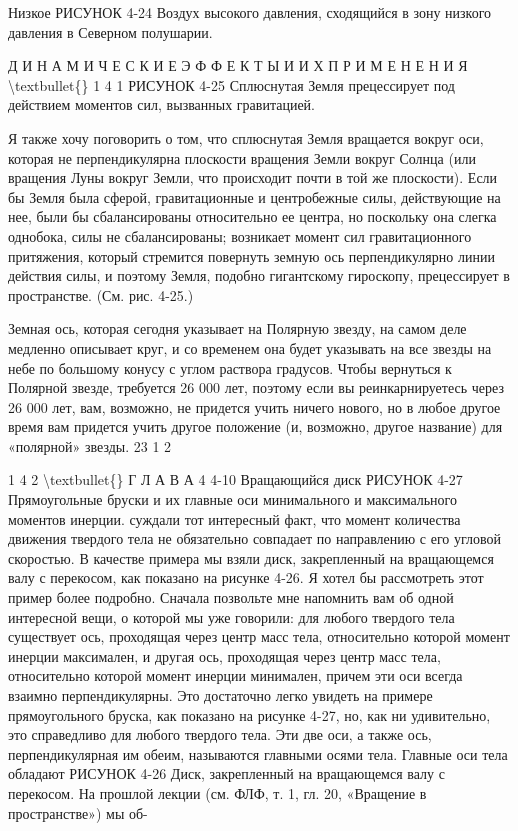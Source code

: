 \documentclass[10pt,oneside]{article}
\begin{document}
Низкое РИСУНОК 4-24 Воздух высокого давления, сходящийся в зону низкого давления в Северном полушарии.\par

Д И Н А М И Ч Е С К И Е  Э Ф Ф Е К Т Ы  И  И Х  П Р И М Е Н Е Н И Я \textbackslash{}textbullet\{\} 1 4 1 РИСУНОК 4-25 Сплюснутая Земля прецессирует под действием моментов сил, вызванных гравитацией.\par

Я также хочу поговорить о том, что сплюснутая Земля вращается вокруг оси, которая не перпендикулярна плоскости вращения Земли вокруг Солнца (или вращения Луны вокруг Земли, что происходит почти в той же плоскости). Если бы Земля была сферой, гравитационные и центробежные силы, действующие на нее, были бы сбалансированы относительно ее центра, но поскольку она слегка однобока, силы не сбалансированы; возникает момент сил гравитационного притяжения, который стремится повернуть земную ось перпендикулярно линии действия силы, и поэтому Земля, подобно гигантскому гироскопу, прецессирует в пространстве. (См. рис. 4-25.)\par

Земная ось, которая сегодня указывает на Полярную звезду, на самом деле медленно описывает круг, и со временем она будет указывать на все звезды на небе по большому конусу с углом раствора градусов. Чтобы вернуться к Полярной звезде, требуется 26 000 лет, поэтому если вы реинкарнируетесь через 26 000 лет, вам, возможно, не придется учить ничего нового, но в любое другое время вам придется учить другое положение (и, возможно, другое название) для «полярной» звезды. 23 1 2\par

1 4 2 \textbackslash{}textbullet\{\} Г Л А В А  4 4-10 Вращающийся диск РИСУНОК 4-27 Прямоугольные бруски и их главные оси минимального и максимального моментов инерции. суждали тот интересный факт, что момент количества движения твердого тела не обязательно совпадает по направлению с его угловой скоростью. В качестве примера мы взяли диск, закрепленный на вращающемся валу с перекосом, как показано на рисунке 4-26. Я хотел бы рассмотреть этот пример более подробно. Сначала позвольте мне напомнить вам об одной интересной вещи, о которой мы уже говорили: для любого твердого тела существует ось, проходящая через центр масс тела, относительно которой момент инерции максимален, и другая ось, проходящая через центр масс тела, относительно которой момент инерции минимален, причем эти оси всегда взаимно перпендикулярны. Это достаточно легко увидеть на примере прямоугольного бруска, как показано на рисунке 4-27, но, как ни удивительно, это справедливо для любого твердого тела. Эти две оси, а также ось, перпендикулярная им обеим, называются главными осями тела. Главные оси тела обладают РИСУНОК 4-26 Диск, закрепленный на вращающемся валу с перекосом. На прошлой лекции (см. ФЛФ, т. 1, гл. 20, «Вращение в пространстве») мы об-\par
\end{document}
